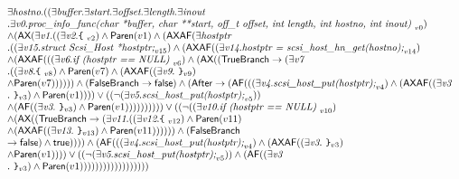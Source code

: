 \documentclass{article}
\newcommand{\AX}{\mbox{\sf{AX}}}
\newcommand{\AF}{\mbox{\sf{AF}}}
\newcommand{\mita}[1]{\mbox{\it{{#1}}}}
\newcommand{\msf}[1]{\mbox{\sf{{#1}}}}
\newcommand{\ttlb}{\mbox{\tt \char'173}}
\newcommand{\ttrb}{\mbox{\tt \char'175}}
\begin{document}
\[\begin{array}{l}
\exists \mita{hostno} . ((\exists \mita{buffer} . \exists \mita{start} . \exists \mita{offset} . \exists \mita{length} . \exists \mita{inout}\\ . \exists \mita{v0} . \mita{proc\_info\_func(char *buffer, char **start, off\_t offset, int length,
               int hostno, int inout) }_{v0})\\ \wedge (\AX(\exists \mita{v1} . ((\exists \mita{v2} . \mita{{\ttlb}
  }_{v2}) \wedge \msf{Paren}(v1) \wedge (\AX\AF(\exists \mita{hostptr}\\ . ((\exists \mita{v15} . \mita{struct Scsi\_Host *hostptr;}_{v15}) \wedge (\AX\AF((\exists \mita{v14} . \mita{hostptr = scsi\_host\_hn\_get(hostno);}_{v14})\\ \wedge (\AX\AF(((\exists \mita{v6} . \mita{if (hostptr == NULL) }_{v6}) \wedge (\AX((\msf{TrueBranch} \rightarrow (\exists \mita{v7}\\ . ((\exists \mita{v8} . \mita{{\ttlb}
  }_{v8}) \wedge \msf{Paren}(v7) \wedge (\AX\AF((\exists \mita{v9} . \mita{
{\ttrb}}_{v9})\\ \wedge \msf{Paren}(v7)))))) \wedge (\msf{FalseBranch} \rightarrow \msf{false}) \wedge (\msf{After} \rightarrow (\AF(((\exists \mita{v4} . \mita{scsi\_host\_put(hostptr);}_{v4}) \wedge (\AX\AF((\exists \mita{v3}\\ . \mita{
{\ttrb}}_{v3}) \wedge \msf{Paren}(v1)))) \vee ((\neg (\exists \mita{v5} . \mita{scsi\_host\_put(hostptr);}_{v5}))\\ \wedge (\AF((\exists \mita{v3} . \mita{
{\ttrb}}_{v3}) \wedge \msf{Paren}(v1)))))))))) \vee ((\neg ((\exists \mita{v10} . \mita{if (hostptr == NULL) }_{v10})\\ \wedge (\AX((\msf{TrueBranch} \rightarrow (\exists \mita{v11} . ((\exists \mita{v12} . \mita{{\ttlb}
  }_{v12}) \wedge \msf{Paren}(v11)\\ \wedge (\AX\AF((\exists \mita{v13} . \mita{
{\ttrb}}_{v13}) \wedge \msf{Paren}(v11)))))) \wedge (\msf{FalseBranch}\\ \rightarrow \msf{false}) \wedge \msf{true})))) \wedge (\AF(((\exists \mita{v4} . \mita{scsi\_host\_put(hostptr);}_{v4}) \wedge (\AX\AF((\exists \mita{v3} . \mita{
{\ttrb}}_{v3})\\ \wedge \msf{Paren}(v1)))) \vee ((\neg (\exists \mita{v5} . \mita{scsi\_host\_put(hostptr);}_{v5})) \wedge (\AF((\exists \mita{v3}\\ . \mita{
{\ttrb}}_{v3}) \wedge \msf{Paren}(v1))))))))))))))))))
\end{array}\]
\end{document}
